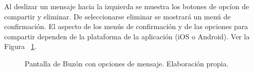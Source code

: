 
Al deslizar un mensaje hacia la izquierda se muestra los botones de opcíon de compartir y eliminar. De seleccionarse eliminar se mostrará un menú de confirmación. El aspecto de los menús de confirmación y de las opciones para compartir dependen de la plataforma de la aplicación (iOS o Android). Ver la Figura ~\ref{fig:pantallaMulti2}.

\begin{figure}[htp]
\centering
  \quad
  \quad
\caption{Pantalla de Buzón con opciones de mensaje. Elaboración propia.}\label{fig:pantallaMulti2}
\end{figure}

